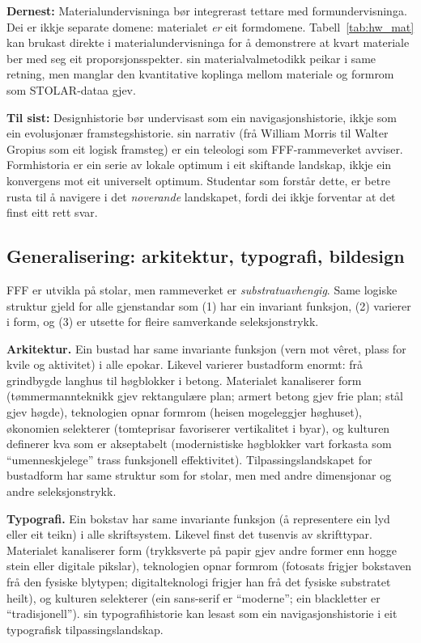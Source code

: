 \documentclass[10pt, a4paper, twocolumn]{article}
\begin{document}
\textbf{Dernest:} Materialundervisninga bør integrerast tettare med formundervisninga. Dei er ikkje separate domene: materialet \emph{er} eit formdomene. Tabell~\ref{tab:hw_mat} kan brukast direkte i materialundervisninga for å demonstrere at kvart materiale ber med seg eit proporsjonsspekter. \citet{ashby2013} sin materialvalmetodikk peikar i same retning, men manglar den kvantitative koplinga mellom materiale og formrom som STOLAR-dataa gjev.

\textbf{Til sist:} Designhistorie bør undervisast som ein navigasjonshistorie, ikkje som ein evolusjonær framstegshistorie. \citet{pevsner1936} sin narrativ (frå William Morris til Walter Gropius som eit logisk framsteg) er ein teleologi som FFF-rammeverket avviser. Formhistoria er ein serie av lokale optimum i eit skiftande landskap, ikkje ein konvergens mot eit universelt optimum. Studentar som forstår dette, er betre rusta til å navigere i det \emph{noverande} landskapet, fordi dei ikkje forventar at det finst eitt rett svar.


\subsection{Generalisering: arkitektur, typografi, bildesign}

FFF er utvikla på stolar, men rammeverket er \emph{substratuavhengig}. Same logiske struktur gjeld for alle gjenstandar som (1) har ein invariant funksjon, (2) varierer i form, og (3) er utsette for fleire samverkande seleksjonstrykk.

\textbf{Arkitektur.} Ein bustad har same invariante funksjon (vern mot vêret, plass for kvile og aktivitet) i alle epokar. Likevel varierer bustadform enormt: frå grindbygde langhus til høgblokker i betong. Materialet kanaliserer form (tømmermannteknikk gjev rektangulære plan; armert betong gjev frie plan; stål gjev høgde), teknologien opnar formrom (heisen mogeleggjer høghuset), økonomien selekterer (tomteprisar favoriserer vertikalitet i byar), og kulturen definerer kva som er akseptabelt (modernistiske høgblokker vart forkasta som ``umenneskjelege'' trass funksjonell effektivitet). Tilpassingslandskapet for bustadform har same struktur som for stolar, men med andre dimensjonar og andre seleksjonstrykk.

\textbf{Typografi.} Ein bokstav har same invariante funksjon (å representere ein lyd eller eit teikn) i alle skriftsystem. Likevel finst det tusenvis av skrifttypar. Materialet kanaliserer form (trykksverte på papir gjev andre former enn hogge stein eller digitale pikslar), teknologien opnar formrom (fotosats frigjer bokstaven frå den fysiske blytypen; digitalteknologi frigjer han frå det fysiske substratet heilt), og kulturen selekterer (ein sans-serif er ``moderne''; ein blackletter er ``tradisjonell''). \citet{meggs2012} sin typografihistorie kan lesast som ein navigasjonshistorie i eit typografisk tilpassingslandskap.
\end{document}

